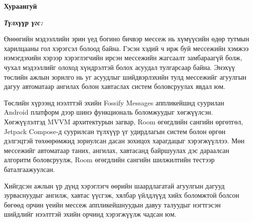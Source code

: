 

\begin{center}
{\scshape\Large \univname\par} %
{\scshape\large \facname\par}\vspace{0.5cm} %
{\huge\textbf{{Хураангуй}} \par}
\bigskip
{\Large{\ttitle} \par} %
\bigskip

{\normalsize \shortname \par} %
\addressname
\end{center}

\textit{\textbf{Түлхүүр үгс: \keywordnames}}
\bigskip

Өнөөгийн мэдээллийн эрин үед богино бичвэр мессеж нь хүмүүсийн өдөр тутмын харилцааны гол хэрэгсэл болоод байна. Гэсэн хэдий ч ирж буй мессежийн хэмжээ нэмэгдэхийн хэрээр хэрэглэгчийн ирсэн мессежийн жагсаалт замбараагүй болж, чухал мэдээллийг олоход хүндрэлтэй болох асуудал тулгарсаар байна. Энэхүү төслийн ажлын зорилго нь уг асуудлыг шийдвэрлэхийн тулд мессежийг агуулгын дагуу автоматаар ангилах болон хавтаслах систем боловсруулах явдал юм.


Төслийн хүрээнд нээлттэй эхийн Fossify Messages аппликейшнд суурилан Android платформ дээр шинэ функциональ боломжуудыг хөгжүүлсэн. Хөгжүүлэлтэд MVVM архитектурын загвар, Room өгөгдлийн сангийн өргөтгөл, Jetpack Compose-д суурилсан түлхүүр үг удирдлагын систем болон өргөн дэлгэцтэй төхөөрөмжид зориулсан дасан зохицох харагдацыг хэрэгжүүллээ. Мөн мессежийг автоматаар таних, ангилах, хавтасанд байршуулах дэс дараалсан алгоритм боловсруулж, Room өгөгдлийн сангийн шилжилтийн тестээр баталгаажуулсан.


Хийгдсэн ажлын үр дүнд хэрэглэгч өөрийн шаардлагатай агуулгын дагууд зурваснуудыг ангилж, хавтас үүсгэж, хялбар үйлдлүүд хийх боломжтой болсон бөгөөд орчин үеийн мессеж аппликейшнуудын давуу талуудыг нэгтгэсэн шийдлийг нээлттэй эхийн орчинд хэрэгжүүлж чадсан юм.


